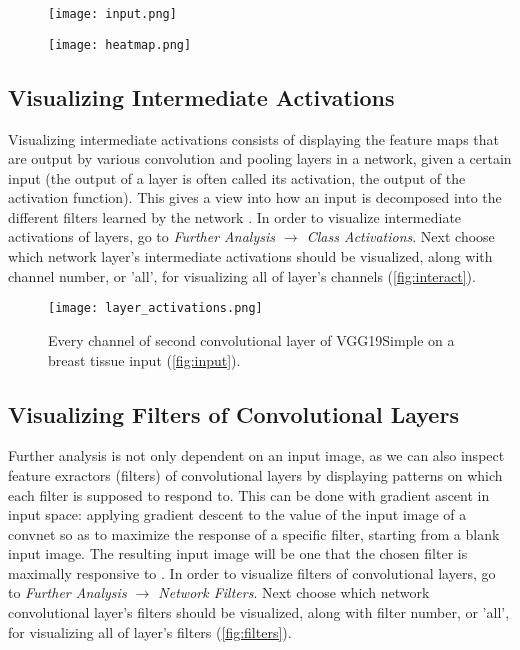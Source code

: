 \begin{figure}[h]
	\centering
	\begin{minipage}{.5\textwidth}
		\centering
		\texttt{[image: input.png]}
		\label{fig:input}
	\end{minipage}%
	\begin{minipage}{.5\textwidth}
		\centering
		\texttt{[image: heatmap.png]}
		\label{fig:heatmap}
	\end{minipage}
\end{figure}

\subsection{Visualizing Intermediate Activations}

Visualizing intermediate activations consists of displaying the feature maps that are output by various convolution and pooling layers in a network, given a certain input (the output of a layer is often called its activation, the output of the activation function). This gives a view into how an input is decomposed into the different filters learned by the network \cite{chollet2018deep}. In order to visualize intermediate activations of layers, go to \emph{Further Analysis $\rightarrow$ Class Activations}. Next choose which network layer's intermediate activations should be visualized, along with channel number, or 'all', for visualizing all of layer's channels  (\textcolor{red}{\autoref{fig:interact}}).
\clearpage

\begin{figure}[h]
	\centering
	\texttt{[image: layer\_activations.png]}
	\caption{Every channel of second convolutional layer of VGG19Simple on a breast tissue input (\textcolor{red}{\autoref{fig:input}}).}
	\label{fig:interact}
\end{figure}

\subsection{Visualizing Filters of Convolutional Layers}

Further analysis is not only dependent on an input image, as we can also inspect feature exractors (filters) of convolutional layers by displaying patterns on which each filter is supposed to respond to. This can be done with gradient ascent in input space: applying gradient descent to the value of the input image of a convnet so as to maximize the response of a specific filter, starting from a blank input image. The resulting input image will be one that the chosen filter is maximally responsive to \cite{chollet2018deep}. In order to visualize filters of convolutional layers, go to \emph{Further Analysis $\rightarrow$ Network Filters}.  Next choose which network convolutional layer's filters should be visualized, along with filter number, or 'all', for visualizing all of layer's filters  (\textcolor{red}{\autoref{fig:filters}}).

